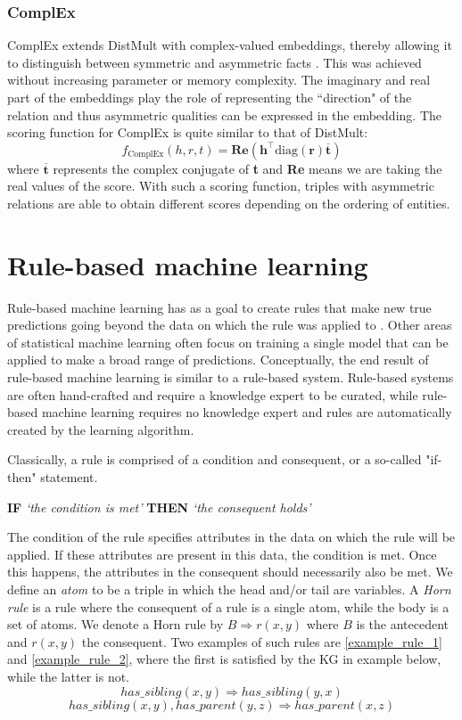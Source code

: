 \subsubsection{ComplEx}
ComplEx extends DistMult with complex-valued embeddings, thereby allowing it to distinguish between symmetric and asymmetric facts \cite{complEx}. This was achieved without increasing parameter or memory complexity. The imaginary and real part of the embeddings play the role of representing the ``direction" of the relation and thus asymmetric qualities can be expressed in the embedding. The scoring function for ComplEx is quite similar to that of DistMult:
\[f_ {\text{ComplEx}}(h, r, t) =\textbf{Re}(\textbf{h}^{\top}\text{diag}(\textbf{r})\overline{\textbf{t}})\]
where $\overline{\textbf{t}}$ represents the complex conjugate of \textbf{t} and \textbf{Re} means we are taking the real values of the score. With such a scoring function, triples with asymmetric relations are able to obtain different scores depending on the ordering of entities.
    

\section{Rule-based machine learning}
Rule-based machine learning has as a goal to create rules that make new true predictions going beyond the data on which the rule was applied to \cite{weiss1995rule}. Other areas of statistical machine learning often focus on training a single model that can be applied to make a broad range of predictions. Conceptually, the end result of rule-based machine learning is similar to a rule-based system.  Rule-based systems are often hand-crafted and require a knowledge expert to be curated, while rule-based machine learning requires no knowledge expert and rules are automatically created by the learning algorithm.

Classically, a rule is comprised of a condition and consequent, or a so-called "if-then" statement. \begin{center} \textbf{IF} \textit{`the condition is met'} \textbf{THEN} \textit{`the consequent holds'} \end{center}
The condition of the rule specifies attributes in the data on which the rule will be applied. If these attributes are present in this data, the condition is met. Once this happens, the attributes in the consequent should necessarily also be met. We define an \textit{atom} to be a triple in which the head and/or tail are variables. A \textit{Horn rule} is a rule where the consequent of a rule is a single atom, while the body is a set of atoms. We denote a Horn rule by $B \Rightarrow r(x, y)$ where $B$ is the antecedent and $r(x, y)$ the consequent. Two examples of such rules are \ref{example_rule_1} and \ref{example_rule_2}, where the first is satisfied by the KG in example below, while the latter is not.
\begin{equation}
has\_sibling(x, y) \Rightarrow has\_sibling(y,x)
\label{example_rule_1}
\end{equation}
\begin{equation}
    has\_sibling(x, y), has\_parent(y,z) \Rightarrow has\_parent(x,z)
    \label{example_rule_2}
\end{equation}


